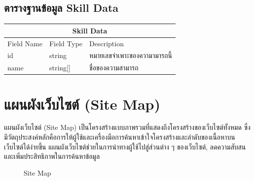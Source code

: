 \subsection{ตารางฐานข้อมูล Skill Data}
\begin{table}[H]
    \begin{tabularx}{\textwidth}{|l|l|X|}
        \hline
        \multicolumn{3}{|c|}{Skill Data}                              \\\hline
        Field Name    & Field Type & Description                  \\\hline
        id    & string     & หมายเลขจำเพาะของความามารถนี้       \\
        name  & string[]   & ชื่อของความสามารถ \\ \hline
    \end{tabularx}
\end{table}


\section{แผนผังเว็บไซต์ (Site Map)}
แผนผังเว็บไซต์ (Site Map) เป็นโครงสร้างแบบภาพรวมที่แสดงถึงโครงสร้างของเว็บไซต์ทั้งหมด ซึ่งมีวัตถุประสงค์หลักคือการให้ผู้ใช้และเครื่องมือการค้นหาเข้าใจโครงสร้างและลำดับของเนื้อหาบนเว็บไซต์ได้ง่ายขึ้น แผนผังเว็บไซต์ช่วยในการนำทางผู้ใช้ไปสู่ส่วนต่าง ๆ ของเว็บไซต์, ลดความสับสนและเพิ่มประสิทธิภาพในการค้นหาข้อมูล

\begin{figure}[H]\centering
    \setlength{\fboxrule}{0.2mm} %
    \setlength{\fboxsep}{0.5cm}
    \caption{Site Map}\label{fig:siteMap}
\end{figure}

